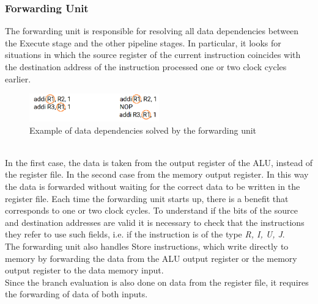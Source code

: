 \subsubsection{Forwarding Unit}
The forwarding unit is responsible for resolving all data dependencies between the Execute stage and the other pipeline stages. In particular, it looks for situations in which the source register of the current instruction coincides with the destination address of the instruction processed one or two clock cycles earlier.
\begin{figure}[htbp]
	\centering
	\includegraphics[width=0.5\textwidth]{sec2/images/data_dependency.png}
	\caption{Example of data dependencies solved by the forwarding unit}
	\label{fig:zero_skipping}
\end{figure}
\\In the first case, the data is taken from the output register of the ALU, instead of the register file. In the second case from the memory output register. In this way the data is forwarded without waiting for the correct data to be written in the register file. Each time the forwarding unit starts up, there is a benefit that corresponds to one or two clock cycles. To understand if the bits of the source and destination addresses are valid it is necessary to check that the instructions they refer to use such fields, i.e. if the instruction is of the type \textit{R, I, U, J}.\\
The forwarding unit also handles Store instructions, which write directly to memory by forwarding the data from the ALU output register or the memory output register to the data memory input.\\
Since the branch evaluation is also done on data from the register file, it requires the forwarding of data of both inputs.
